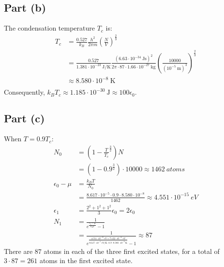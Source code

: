 \documentclass{article}
\begin{document}
\subsection*{Part (b)}
The condensation temperature $T_c$ is:
\begin{equation}
    \begin{split}
        T_c & = \frac{0.527}{k_B}\frac{h^2}{2\pi m}{\left(\frac{N}{V}\right)}^{\frac{2}{3}} \\
        & = \frac{0.527}{1.381 \cdot 10^{-23}~\unit{\joule\per\kelvin}}\frac{{\left(6.63 \cdot 10^{-34}~\unit{\joule\second}\right)}^2}{2\pi \cdot 87 \cdot 1.66 \cdot 10^{-27}~\unit{\kilo\gram}}{\left(\frac{10000}{{\left(10^{-5}~\unit{\meter}\right)}^3}\right)}^{\frac{2}{3}} \\
        & \approx 8.580 \cdot 10^{-8}~\unit{\kelvin} \\
    \end{split}
\end{equation}
Consequently, $k_BT_c \approx 1.185 \cdot 10^{-30}~\unit{\joule} \approx 100\epsilon_0$.
\subsection*{Part (c)}
When $T = 0.9T_c$:
\begin{equation}
    \begin{split}
        N_0 & = \left(1 - \frac{T}{T_c}^{\frac{3}{2}}\right)N \\
        & = \left(1 - 0.9^{\frac{3}{2}}\right) \cdot 10000 \approx 1462~\unit{atoms} \\
        \epsilon_0 - \mu & = \frac{k_BT}{N_0} \\
        & = \frac{8.617 \cdot 10^{-5} \cdot 0.9 \cdot 8.580 \cdot 10^{-8}}{1462} \approx 4.551 \cdot 10^{-15}~\unit{eV} \\
        \epsilon_1 & = \frac{2^2 + 1^2 + 1^2}{3}\epsilon_0 = 2\epsilon_0 \\
        N_1 & = \frac{1}{e^{\frac{\epsilon_1 - \mu}{k_BT}} - 1} \\
        & = \frac{1}{e^{\frac{4.551 \cdot 10^{-15}~\unit{eV} + 7.122 \cdot 10^{-14}~\unit{eV}}{8.617 \cdot 10^{-5}~\unit{eV\per\kelvin} \cdot 0.9 \cdot 8.580 \cdot 10^{-8}~\unit{\kelvin} }} - 1} \approx 87
    \end{split}
\end{equation}
There are $87$ atoms in each of the three first excited states, for a total of $3 \cdot 87 = 261$ atoms in the first excited state.
\end{document}
